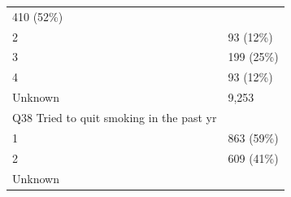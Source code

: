 \documentclass[]{article}
\begin{document}
\begin{longtable}[]{@{}ll@{}}
\begin{minipage}[t]{0.23\columnwidth}
410 (52\%)\strut
\end{minipage}\tabularnewline
\begin{minipage}[t]{0.71\columnwidth}\raggedright
2\strut
\end{minipage} & \begin{minipage}[t]{0.23\columnwidth}\raggedright
93 (12\%)\strut
\end{minipage}\tabularnewline
\begin{minipage}[t]{0.71\columnwidth}\raggedright
3\strut
\end{minipage} & \begin{minipage}[t]{0.23\columnwidth}\raggedright
199 (25\%)\strut
\end{minipage}\tabularnewline
\begin{minipage}[t]{0.71\columnwidth}\raggedright
4\strut
\end{minipage} & \begin{minipage}[t]{0.23\columnwidth}\raggedright
93 (12\%)\strut
\end{minipage}\tabularnewline
\begin{minipage}[t]{0.71\columnwidth}\raggedright
Unknown\strut
\end{minipage} & \begin{minipage}[t]{0.23\columnwidth}\raggedright
9,253\strut
\end{minipage}\tabularnewline
\begin{minipage}[t]{0.71\columnwidth}\raggedright
Q38 Tried to quit smoking in the past yr\strut
\end{minipage} & \begin{minipage}[t]{0.23\columnwidth}\raggedright
\strut
\end{minipage}\tabularnewline
\begin{minipage}[t]{0.71\columnwidth}\raggedright
1\strut
\end{minipage} & \begin{minipage}[t]{0.23\columnwidth}\raggedright
863 (59\%)\strut
\end{minipage}\tabularnewline
\begin{minipage}[t]{0.71\columnwidth}\raggedright
2\strut
\end{minipage} & \begin{minipage}[t]{0.23\columnwidth}\raggedright
609 (41\%)\strut
\end{minipage}\tabularnewline
\begin{minipage}[t]{0.71\columnwidth}\raggedright
Unknown\strut
\end{minipage} & \begin{minipage}[t]{0.23\columnwidth}\raggedright

\end{minipage}
\end{longtable}
\end{document}
